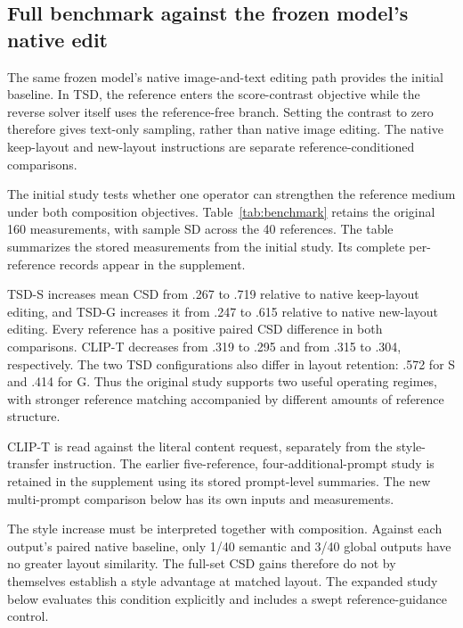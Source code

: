 \subsection{Full benchmark against the frozen model's native edit}
\label{sec:initialresults}
The same frozen model's native image-and-text editing path provides the
initial baseline. In TSD, the reference enters the score-contrast objective
while the reverse solver itself uses the reference-free branch. Setting the
contrast to zero therefore gives text-only sampling, rather than native
image editing. The native keep-layout and new-layout instructions are
separate reference-conditioned comparisons.

The initial study tests whether one operator can strengthen the reference
medium under both composition objectives. Table~\ref{tab:benchmark} retains
the original 160 measurements, with sample SD across the 40 references.
The table summarizes the stored measurements from the initial study.
Its complete per-reference records appear in the supplement.

\begin{table}[t]
\centering\small
\caption{Initial 40-reference study, one content prompt and seed 65.
Values are mean $\pm$ sample SD across references. S/G are the original
semantic/global configurations. Layout measures retention of reference
structure, whose desired level depends on the task.}
\label{tab:benchmark}
\resizebox{\columnwidth}{!}{}
\end{table}

TSD-S increases mean CSD from .267 to .719 relative to native keep-layout
editing, and TSD-G increases it from .247 to .615 relative to native
new-layout editing. Every reference has a positive paired CSD difference
in both comparisons. CLIP-T decreases from .319 to .295 and from .315 to
.304, respectively. The two TSD configurations also differ in layout
retention: .572 for S and .414 for G. Thus the original study supports two
useful operating regimes, with stronger reference matching accompanied by
different amounts of reference structure.

CLIP-T is read against the literal content request, separately from the
style-transfer instruction. The earlier five-reference, four-additional-prompt
study is retained in the supplement using its stored prompt-level summaries.
The new multi-prompt comparison below has its own inputs and measurements.

The style increase must be interpreted together with composition. Against
each output's paired native baseline, only 1/40 semantic and 3/40 global
outputs have no greater layout similarity. The full-set CSD gains therefore
do not by themselves establish a style advantage at matched layout. The
expanded study below evaluates this condition explicitly and includes a
swept reference-guidance control.

